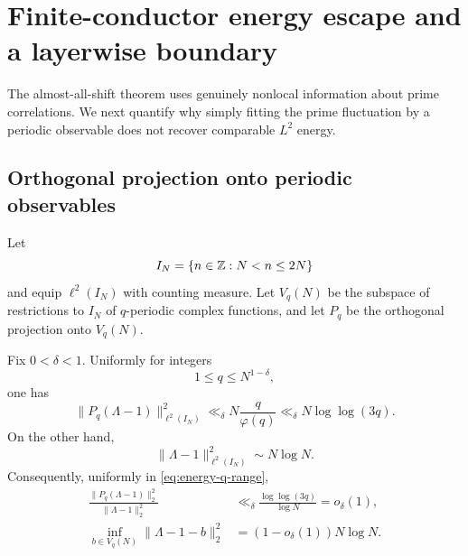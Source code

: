 \section{Finite-conductor energy escape and a layerwise boundary}
\label{sec:finite-conductor-barriers}

The almost-all-shift theorem uses genuinely nonlocal information about prime
correlations.  We next quantify why simply fitting the prime fluctuation by a
periodic observable does not recover comparable $L^2$ energy.

\subsection{Orthogonal projection onto periodic observables}
\label{subsec:periodic-projection}

Let
\begin{equation}\label{eq:dyadic-integer-interval}
 I_N=\{n\in\mathbb Z:N<n\le2N\}
\end{equation}
and equip $\ell^2(I_N)$ with counting measure.  Let $V_q(N)$ be the subspace
of restrictions to $I_N$ of $q$-periodic complex functions, and let $P_q$ be
the orthogonal projection onto $V_q(N)$.

\begin{theorem}
\label{thm:finite-conductor-energy-escape}
Fix $0<\delta<1$.  Uniformly for integers
\begin{equation}\label{eq:energy-q-range}
 1\le q\le N^{1-\delta},
\end{equation}
one has
\begin{equation}\label{eq:periodic-projection-bound}
 \|P_q(\Lambda-1)\|_{\ell^2(I_N)}^2
 \ll_\delta N\frac q{\varphi(q)}
 \ll_\delta N\log\log(3q).
\end{equation}
On the other hand,
\begin{equation}\label{eq:prime-fluctuation-energy}
 \|\Lambda-1\|_{\ell^2(I_N)}^2\sim N\log N.
\end{equation}
Consequently, uniformly in \eqref{eq:energy-q-range},
\begin{align}
 \frac{\|P_q(\Lambda-1)\|_2^2}{\|\Lambda-1\|_2^2}
 &\ll_\delta\frac{\log\log(3q)}{\log N}=o_\delta(1),
 \label{eq:captured-energy-ratio}\\
 \inf_{b\in V_q(N)}\|\Lambda-1-b\|_2^2
 &=(1-o_\delta(1))N\log N.
 \label{eq:periodic-best-approximation}
\end{align}
\end{theorem}

